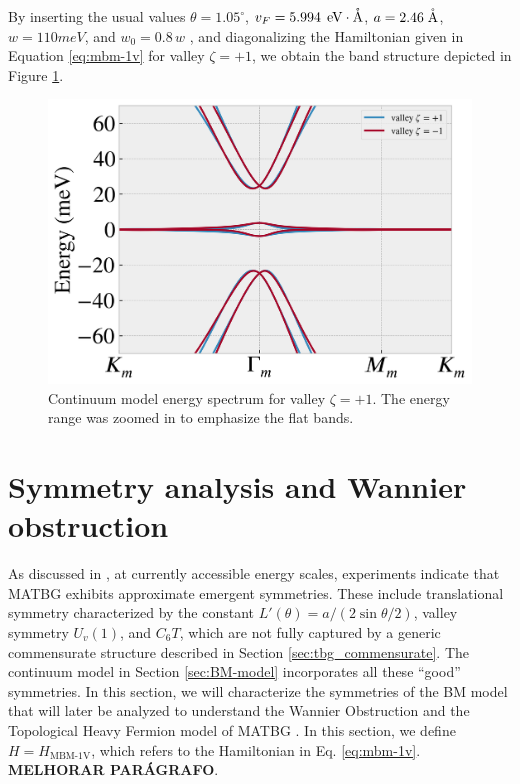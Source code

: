 By inserting the usual values \( \theta = 1.05^\circ \), \( v_F = 5.994 \, \; \mathrm{eV \cdot {\mathring{\text{A}}}} \), \( a = 2.46 \; \mathrm{{\mathring{\text{A}}}} \), \( w = 110 \unit{meV} \), and \( w_0 = 0.8 \, w \) \cite{topoheavyfermion2022}, and diagonalizing the Hamiltonian given in Equation \ref{eq:mbm-1v} for valley \( \zeta = +1 \), we obtain the band structure depicted in Figure \ref{fig:continuum_model_bands}.

\begin{figure}[H]
\centering
\includegraphics[width=0.8\linewidth]{fig/continuum_model_bands.png}
\caption{Continuum model energy spectrum for valley \( \zeta = +1 \). The energy range was zoomed in to emphasize the flat bands.}
\label{fig:continuum_model_bands}
\end{figure}


\section{Symmetry analysis and Wannier obstruction} \label{sec:symmetry_analysis}

As discussed in \cite{zou2018}, at currently accessible energy scales, experiments indicate that MATBG exhibits approximate emergent symmetries. These include translational symmetry characterized by the constant $L'(\theta) = a / (2 \sin\theta/2)$, valley symmetry $U_v(1)$, and $C_{6} T$, which are not fully captured by a generic commensurate structure described in Section \ref{sec:tbg_commensurate}. The continuum model in Section \ref{sec:BM-model} incorporates all these ``good'' symmetries. In this section, we will characterize the symmetries of the BM model that will later be analyzed to understand the Wannier Obstruction \cite{zou2018} and the Topological Heavy Fermion model of MATBG \cite{topoheavyfermion2022}.
In this section, we define $H = H_{\text{MBM-1V}}$, which refers to the Hamiltonian in Eq. \eqref{eq:mbm-1v}. \textbf{MELHORAR PARÁGRAFO}.

